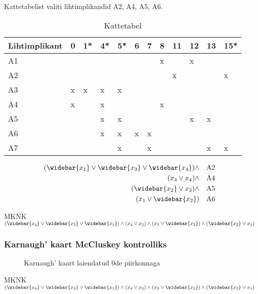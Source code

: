\documentclass{article}
\begin{document}
Kattetabelist valiti lihtimplikandid A2, A4, A5, A6.
\begin{table}[H]
\centering
\caption{Kattetabel}
\label{kattetabel}
\begin{tabular}{|l|l|l|l|l|l|l|l|l|l|l|l|}
\hline
Lihtimplikant & 0 & 1* & 4* & 5* & 6 & 7 & 8 & 11 & 12 & 13 & 15* \\ \hline
A1            &   &    &    &    &   &   & x &    & x  &    &     \\ \hline
\rowcolor{LightCyan}
A2            &   &    &    &    &   &   &   & x  &    &    & x   \\ \hline
A3            & x & x  & x  & x  &   &   &   &    &    &    &     \\ \hline
\rowcolor{LightCyan}
A4            & x &    & x  &    &   &   & x &    &    &    &     \\ \hline
\rowcolor{LightCyan}
A5            &   &    & x  & x  &   &   &   &    & x  & x  &     \\ \hline
\rowcolor{LightCyan}
A6            &   &    & x  & x  & x & x &   &    &    &    &     \\ \hline
A7            &   &    &    & x  &   & x &   &    &    & x  & x   \\ \hline
\end{tabular}
\end{table}

\begin{align*} 
(\widebar{x_1}\lor\widebar{x_3}\lor\widebar{x_4})\land &&\mbox{A2}\\
(x_3\lor x_4)\land &&\mbox{A4}\\
(\widebar{x_2} \lor x_3)\land &&\mbox{A5}\\
(x_1\lor \widebar{x_2}) &&\mbox{A6}
\end{align*}

MKNK $(\widebar{x_4} \lor \widebar{x_3} \lor \widebar{x_1}) \land (x_4 \lor x_3) \land (x_3 \lor \widebar{x_2}) \land (\widebar{x_2} \lor x_1)$
\subsubsection{Karnaugh' kaart McCluskey kontrolliks}
\begin{figure}[H]
\centering
\begin{Karnaugh}
\end{Karnaugh}
\caption{Karnaugh' kaart laiendatud 0de piirkonnaga}
\label{fig:karnaugh-piirkond0}
\end{figure}
MKNK $(\widebar{x_4} \lor \widebar{x_3} \lor \widebar{x_1}) \land (x_4 \lor x_3) \land (x_3 \lor \widebar{x_2}) \land (\widebar{x_2} \lor x_1)$
\end{document}
